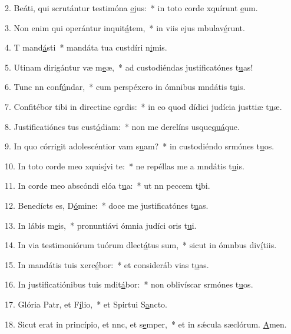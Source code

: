 2. Beáti, qui scrutántur testimóna \uline{e}jus:~* in toto corde xquírunt \uline{e}um.\par 
3. Non enim qui operántur inquit\uline{á}tem,~* in viis ejus mbulav\uline{é}runt.\par 
4. T mand\uline{á}sti~* mandáta tua custdíri n\uline{i}mis.\par 
5. Utinam dirigántur væ m\uline{e}æ,~* ad custodiéndas justificatónes t\uline{u}as!\par 
6. Tunc nn conf\uline{ú}ndar,~* cum perspéxero in ómnibus mndátis t\uline{u}is.\par 
7. Confitébor tibi in directine c\uline{o}rdis:~* in eo quod dídici judícia justtiæ t\uline{u}æ.\par 
8. Justificatiónes tus cust\uline{ó}diam:~* non me derelíns usque\uline{quá}que.\par 
9. In quo córrigit adolescéntior vam s\uline{u}am?~* in custodiéndo srmónes t\uline{u}os.\par 
10. In toto corde meo xquis\uline{í}vi te:~* ne repéllas me a mndátis t\uline{u}is.\par 
11. In corde meo abscóndi elóa t\uline{u}a:~* ut nn peccem t\uline{i}bi.\par 
12. Benedícts es, D\uline{ó}mine:~* doce me justificatónes t\uline{u}as.\par 
13. In lábis m\uline{e}is,~* pronuntiávi ómnia judíci oris t\uline{u}i.\par 
14. In via testimoniórum tuórum dlect\uline{á}tus sum,~* sicut in ómnbus div\uline{í}tiis.\par 
15. In mandátis tuis xerc\uline{é}bor:~* et consideráb vias t\uline{u}as.\par 
16. In justificatiónibus tuis mdit\uline{á}bor:~* non oblivíscar srmónes t\uline{u}os.\par 
17. Glória Patr, et F\uline{í}lio,~* et Spirtui S\uline{a}ncto.\par 
18. Sicut erat in princípio, et nnc, et s\uline{e}mper,~* et in sǽcula sæclórum. \uline{A}men.\par 
